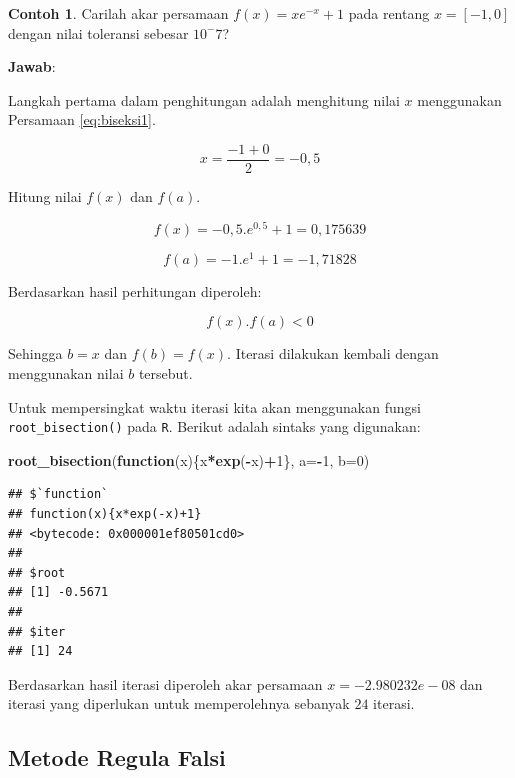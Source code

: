\documentclass[
]{book}
\newenvironment{Shaded}{\begin{snugshade}}{\end{snugshade}}
\newcommand{\AttributeTok}[1]{\textcolor[rgb]{0.13,0.29,0.53}{#1}}
\newcommand{\ControlFlowTok}[1]{\textcolor[rgb]{0.13,0.29,0.53}{\textbf{#1}}}
\newcommand{\DecValTok}[1]{\textcolor[rgb]{0.00,0.00,0.81}{#1}}
\newcommand{\FunctionTok}[1]{\textcolor[rgb]{0.13,0.29,0.53}{\textbf{#1}}}
\newcommand{\NormalTok}[1]{#1}
\newcommand{\SpecialCharTok}[1]{\textcolor[rgb]{0.81,0.36,0.00}{\textbf{#1}}}
\theoremstyle{definition}
\theoremstyle{definition}
\newtheorem{example}{Contoh}[chapter]
\theoremstyle{definition}
\theoremstyle{definition}
\theoremstyle{remark}
\begin{document}
\begin{example}
\protect\hypertarget{exm:biseksexmp}{}\label{exm:biseksexmp}Carilah akar persamaan \(f\left(x \right)=xe^{-x}+1\) pada rentang \(x=\left[-1,0 \right]\) dengan nilai toleransi sebesar \(10^-7\)?
\end{example}

\textbf{Jawab}:

Langkah pertama dalam penghitungan adalah menghitung nilai \(x\) menggunakan Persamaan \eqref{eq:biseksi1}.

\[
x=\frac{-1+0}{2}=-0,5
\]

Hitung nilai \(f\left(x \right)\) dan \(f\left(a \right)\).

\[
f\left(x \right)=-0,5.e^{0,5}+1=0,175639
\]

\[
f\left(a \right)=-1.e^{1}+1=-1,71828
\]

Berdasarkan hasil perhitungan diperoleh:

\[
f\left(x \right).f\left(a \right)<0
\]

Sehingga \(b=x\) dan \(f\left(b \right)=f\left(x \right)\). Iterasi dilakukan kembali dengan menggunakan nilai \(b\) tersebut.

Untuk mempersingkat waktu iterasi kita akan menggunakan fungsi \texttt{root\_bisection()} pada \texttt{R}. Berikut adalah sintaks yang digunakan:

\begin{Shaded}
\begin{Highlighting}[]
\FunctionTok{root\_bisection}\NormalTok{(}\ControlFlowTok{function}\NormalTok{(x)\{x}\SpecialCharTok{*}\FunctionTok{exp}\NormalTok{(}\SpecialCharTok{{-}}\NormalTok{x)}\SpecialCharTok{+}\DecValTok{1}\NormalTok{\},}
               \AttributeTok{a=}\SpecialCharTok{{-}}\DecValTok{1}\NormalTok{, }\AttributeTok{b=}\DecValTok{0}\NormalTok{)}
\end{Highlighting}
\end{Shaded}

\begin{verbatim}
## $`function`
## function(x){x*exp(-x)+1}
## <bytecode: 0x000001ef80501cd0>
## 
## $root
## [1] -0.5671
## 
## $iter
## [1] 24
\end{verbatim}

Berdasarkan hasil iterasi diperoleh akar persamaan \(x=-2.980232e-08\) dan iterasi yang diperlukan untuk memperolehnya sebanyak \(24\) iterasi.

\hypertarget{regulafalsi}{%
\subsection{Metode Regula Falsi}\label{regulafalsi}}
\end{document}
